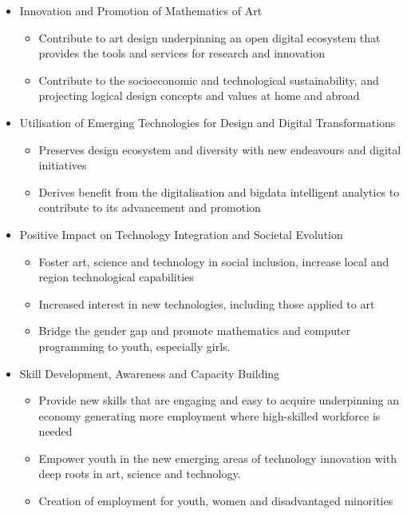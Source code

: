 \documentclass{ammTalk}
\begin{document}
\begin{itemize}[itemsep=5mm]\LARGE
\item Innovation and Promotion of Mathematics of Art
\begin{itemize}\large
\item Contribute to art design underpinning an open digital ecosystem that provides the tools and services for research and innovation
\item Contribute to the socioeconomic and technological sustainability, and projecting logical design concepts and values at home and abroad
\end{itemize}

\item Utilisation of Emerging Technologies for Design and Digital Transformations
\begin{itemize}\large
\item Preserves design  ecosystem and diversity with new endeavours and digital initiatives
\item Derives benefit from the digitalisation and bigdata intelligent analytics to contribute to its advancement and promotion
\end{itemize}

\item Positive Impact on Technology Integration and Societal Evolution
\begin{itemize}\large
\item Foster art, science and technology in social inclusion, increase local and region technological capabilities
\item Increased interest in new technologies, including those applied to art
\item Bridge the gender gap and promote mathematics and computer programming to youth, especially girls.
\end{itemize}

\item Skill Development, Awareness and Capacity Building
\begin{itemize}\large
\item Provide new skills that are engaging and easy to acquire underpinning an economy generating more employment where high-skilled workforce is needed
\item Empower youth in the new emerging areas of technology innovation with deep roots in art, science and technology.
\item Creation of employment for youth, women and disadvantaged minorities
\end{itemize}


\end{itemize}
\end{document}
